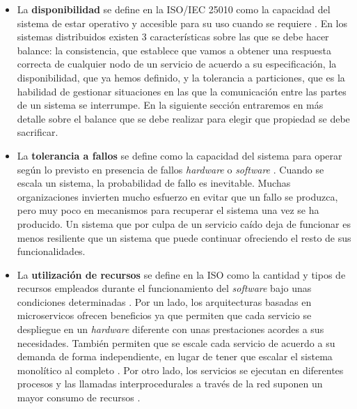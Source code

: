 \documentclass[11pt,spanish,listoffigures]{tfgetsinf}
\begin{document}
\begin{itemize}

\item La \textbf{disponibilidad} se define en la ISO/IEC 25010 como la capacidad del sistema de estar operativo y accesible para su uso cuando se requiere \cite{Standard2010}. En los sistemas distribuidos existen 3 características sobre las que se debe hacer balance: la consistencia, que establece que vamos a obtener una respuesta correcta de cualquier nodo de un servicio de acuerdo a su especificación, la disponibilidad, que ya hemos definido, y la tolerancia a particiones, que es la habilidad de gestionar situaciones en las que la comunicación entre las partes de un sistema se interrumpe. En la siguiente sección entraremos en más detalle sobre el balance que se debe realizar para elegir que propiedad se debe sacrificar.

\item La \textbf{tolerancia a fallos} se define como la capacidad del sistema para operar según lo previsto en presencia de fallos \textit{hardware} o \textit{software} \cite{Standard2010}. Cuando se escala un sistema, la probabilidad de fallo es inevitable. Muchas organizaciones invierten mucho esfuerzo en evitar que un fallo se produzca, pero muy poco en mecanismos para recuperar el sistema una vez se ha producido. Un sistema que por culpa de un servicio caído deja de funcionar es menos resiliente que un sistema que puede continuar ofreciendo el resto de sus funcionalidades.

\item La \textbf{utilización de recursos} se define en la ISO como la cantidad y tipos de recursos empleados durante el funcionamiento del \textit{software} bajo unas condiciones determinadas \cite{Standard2010}. Por un lado, los arquitecturas basadas en microservicos ofrecen beneficios ya que permiten que cada servicio se despliegue en un \textit{hardware} diferente con unas prestaciones acordes a sus necesidades. También permiten que se escale cada servicio de acuerdo a su demanda de forma independiente, en lugar de tener que escalar el sistema monolítico al completo \cite{DelaTorre2018}. Por otro lado, los servicios se ejecutan en diferentes procesos y las llamadas interprocedurales a través de la red suponen un mayor consumo de recursos \cite{FowlerSusan}.


\end{itemize}
\end{document}
